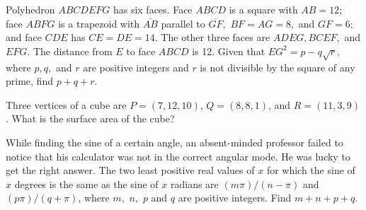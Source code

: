 \documentclass[11pt]{article}
\theoremstyle{definition}
\begin{document}
%	




\begin{question}[name={2002 AIME I, \href{https://artofproblemsolving.com/community/c4p378399}{Problem 15}}]
	Polyhedron $ABCDEFG$ has six faces. Face $ABCD$ is a square with $AB=12;$ face $ABFG$ is a trapezoid with $\overline{AB}$ parallel to $\overline{GF},$ $BF=AG=8,$ and $GF=6;$ and face $CDE$ has $CE=DE=14.$ The other three faces are $ADEG, BCEF,$ and $EFG.$ The distance from $E$ to face $ABCD$ is 12. Given that $EG^2=p-q\sqrt{r},$ where $p, q,$ and $r$ are positive integers and $r$ is not divisible by the square of any prime, find $p+q+r.$	
\end{question}


%	








\begin{question}[name={2002 AIME II, \href{https://artofproblemsolving.com/community/c4p714625}{Problem 2}}]
	Three vertices of a cube are $P=(7,12,10)$, $Q=(8,8,1)$, and $R=(11,3,9)$. What is the surface area of the cube?
\end{question}


%	













\begin{question}[name={2002 AIME II, \href{https://artofproblemsolving.com/community/c4p714637}{Problem 10}}]
	While finding the sine of a certain angle, an absent-minded professor failed to notice that his calculator was not in the correct angular mode. He was lucky to get the right answer. The two least positive real values of $x$ for which the sine of $x$ degrees is the same as the sine of $x$ radians are $(m\pi)/(n-\pi)$ and $(p\pi)/(q+\pi)$, where $m,$ $n,$ $p$ and $q$ are positive integers. Find $m+n+p+q$.
\end{question}
\end{document}
